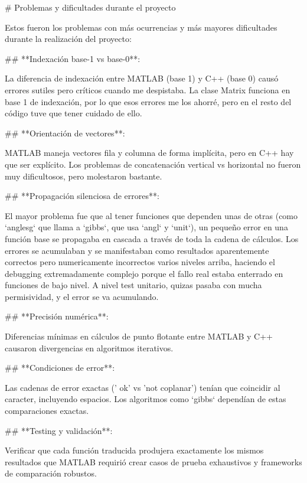 \documentclass[12pt,a4paper]{article}
\begin{document}
\begin{markdown}
# Problemas y dificultades durante el proyecto

Estos fueron los problemas con más ocurrencias y más mayores dificultades durante la realización del proyecto:


## **Indexación base-1 vs base-0**: 

La diferencia de indexación entre MATLAB (base 1) y C++ (base 0) causó errores sutiles pero críticos cuando me despistaba. La clase Matrix funciona en base 1 de indexación, por lo que esos errores me los ahorré, pero en el resto del código tuve que tener cuidado de ello.


## **Orientación de vectores**: 

MATLAB maneja vectores fila y columna de forma implícita, pero en C++ hay que ser explícito. Los problemas de concatenación vertical vs horizontal no fueron muy dificultosos, pero molestaron bastante.


## **Propagación silenciosa de errores**: 

El mayor problema fue que al tener funciones que dependen unas de otras (como `anglesg` que llama a `gibbs`, que usa `angl` y `unit`), un pequeño error en una función base se propagaba en cascada a través de toda la cadena de cálculos. Los errores se acumulaban y se manifestaban como resultados aparentemente correctos pero numericamente incorrectos varios niveles arriba, haciendo el debugging extremadamente complejo porque el fallo real estaba enterrado en funciones de bajo nivel. A nivel test unitario, quizas pasaba con mucha permisividad, y el error se va acumulando.


## **Precisión numérica**: 

Diferencias mínimas en cálculos de punto flotante entre MATLAB y C++ causaron divergencias en algoritmos iterativos.


## **Condiciones de error**: 

Las cadenas de error exactas ('          ok' vs 'not coplanar') tenían que coincidir al caracter, incluyendo espacios. Los algoritmos como `gibbs` dependían de estas comparaciones exactas.


## **Testing y validación**: 

Verificar que cada función traducida produjera exactamente los mismos resultados que MATLAB requirió crear casos de prueba exhaustivos y frameworks de comparación robustos.
\end{markdown}
\end{document}
